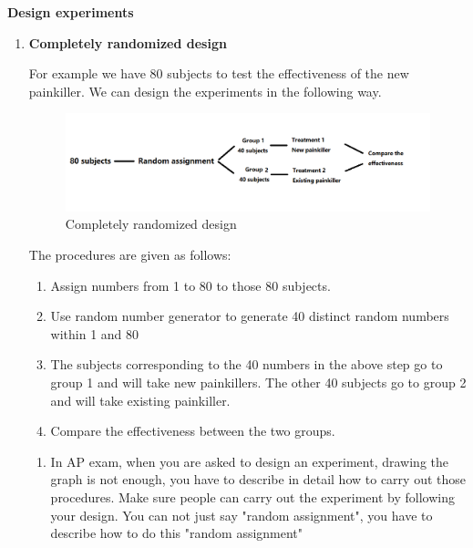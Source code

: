 \documentclass[a4paper, 12pt,twoside]{book}
\begin{document}
   \textbf{\large{Design experiments}}
   \vspace{0.3cm}
   
   \begin{enumerate}[(1)]
       \item \textbf{Completely randomized design}
       
   For example we have 80 subjects to test the effectiveness of the new painkiller. We can design the experiments in the following way.
   
       \begin{figure}[H]
           \centering
           \includegraphics[scale=0.6]{CompletelyRandomizedDesign}
           \caption{Completely randomized design 
            \label{CompletelyRandomizedDesign}}
       \end{figure}
       The procedures are given as follows:
          \begin{enumerate}
              \item Assign numbers from 1 to 80 to those 80 subjects.
              \item Use random number generator to generate 40 distinct random numbers within 1 and 80
              \item The subjects corresponding to the 40 numbers in the above step go to group 1 and will take new painkillers. The other 40 subjects go to group 2 and will take existing painkiller.
              \item Compare the effectiveness between the two groups.
          \end{enumerate}
          \vspace{0.3cm}
     
     \colorbox{babypink}{\parbox{\textwidth}{
     \begin{enumerate}[\Roman*.]
         \item In AP exam, when you are asked to design an experiment, drawing the graph is not enough, you have to describe in detail how to carry out those procedures. Make sure people can carry out the experiment by following your design. You can not just say "random assignment", you have to describe how to do this "random assignment"
         

\end{enumerate}}}
\end{enumerate}
\end{document}
